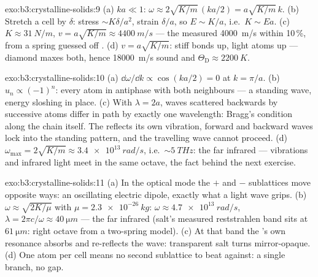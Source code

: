 \begin{solution}{exo:b3:crystalline-solids:9}
(a) $ka \ll 1$: $\omega \approx 2\sqrt{K/m}\,(ka/2) =
a\sqrt{K/m}\,k$. (b) Stretch a cell by $\delta$: stress $\sim
K\delta/a^2$, strain $\delta/a$, so $E \sim K/a$, i.e.\ $K \sim
Ea$. (c) $K \approx \qty{31}{N/m}$, $v = a\sqrt{K/m} \approx
\qty{4400}{m/s}$ --- the measured \qty{4000}{m/s} within 10\,\%,
from a spring guessed off . (d) $v = a\sqrt{K/m}$:
stiff bonds up, light atoms up --- diamond maxes both, hence
\qty{18000}{m/s} sound and $\Theta_{\text{D}} \approx
\qty{2200}{K}$.
\end{solution}

\begin{solution}{exo:b3:crystalline-solids:10}
(a) $\dd\omega/\dd k \propto \cos(ka/2) = 0$ at $k = \pi/a$. (b)
$u_n \propto (-1)^n$: every atom in antiphase with both
neighbours --- a standing wave, energy sloshing in place. (c)
With $\lambda = 2a$, waves scattered backwards by successive
atoms differ in path by exactly one wavelength: Bragg's condition
along the chain itself. The  reflects its own vibration,
forward and backward waves lock into the standing pattern, and
the travelling wave cannot proceed. (d) $\omega_{\text{max}} = 2\sqrt{K/m} \approx
\qty{3.4e13}{rad/s}$, i.e.\ $\sim\qty{5}{THz}$: the far infrared
---  vibrations and infrared light meet in the same octave,
the fact behind the next exercise.
\end{solution}

\begin{solution}{exo:b3:crystalline-solids:11}
(a) In the optical mode the $+$ and $-$ sublattices move opposite
ways: an oscillating electric dipole, exactly what a light wave
grips. (b) $\omega \approx \sqrt{2K/\mu}$ with $\mu =
\qty{2.3e-26}{kg}$: $\omega \approx \qty{4.7e13}{rad/s}$,
$\lambda = 2\pi c/\omega \approx \qty{40}{\micro m}$ --- the far
infrared (salt's measured reststrahlen band sits at
$\qty{61}{\micro m}$: right octave from a two-spring model). (c)
At that band the 's own resonance absorbs and re-reflects
the wave: transparent salt turns mirror-opaque. (d) One atom per
cell means no second sublattice to beat against: a single branch,
no gap.
\end{solution}

